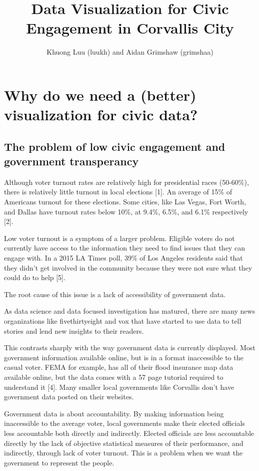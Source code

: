 \documentclass[12pt]{article}
\title{Data Visualization for Civic Engagement in Corvallis City}
\author{Khuong Luu (luukh) and Aidan Grimshaw (grimshaa)}
\begin{document}
\maketitle
\tableofcontents


\section{Why do we need a (better) visualization for civic data?}

\subsection{The problem of low civic engagement and government transperancy}

Although voter turnout rates are relatively high for presidential races (50-60\%), there is relatively little turnout in local elections [1]. An average of 15\% of Americans turnout for these elections. Some cities, like Las Vegas, Fort Worth, and Dallas have turnout rates below 10\%, at 9.4\%, 6.5\%, and 6.1\% respectively [2].

Low voter turnout is a symptom of a larger problem. Eligible voters do not currently have access to the information they need to find issues that they can engage with. In a 2015 LA Times poll,  39\% of Los Angeles residents said that they didn’t get involved in the community because they were not sure what they could do to help [5].

The root cause of this issue is a lack of accessibility of government data.

As data science and data focused investigation has matured, there are many news organizations like fivethirtyeight and vox that have started to use data to tell stories and lend new insights to their readers.

This contrasts sharply with the way government data is currently displayed. Most government information available online, but is in a format inaccessible to the casual voter. FEMA for example, has all of their flood insurance map data available online, but the data comes with a 57 page tutorial required to understand it [4]. Many smaller local governments like Corvallis don’t have government data posted on their websites.

Government data is about accountability. By making information being inaccessible to the average voter, local governments make their elected officials less accountable both directly and indirectly. Elected officials are less accountable directly by the lack of objective statistical measures of their performance, and indirectly, through lack of voter turnout. This is a problem when we want the government to represent the people.
\end{document}
